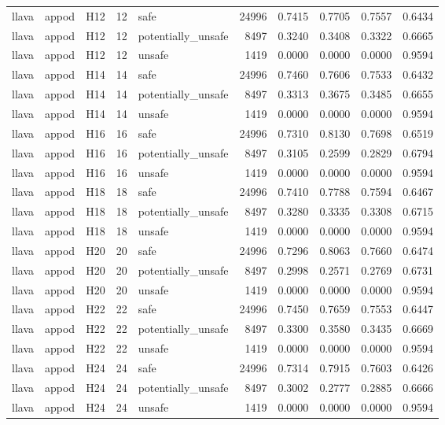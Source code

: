 \begin{table}[tbp]
\begin{tabular}{lllrlrrrrr}
llava & appod & H12 & 12 & safe & 24996 & 0.7415 & 0.7705 & 0.7557 & 0.6434 \\
llava & appod & H12 & 12 & potentially\_unsafe & 8497 & 0.3240 & 0.3408 & 0.3322 & 0.6665 \\
llava & appod & H12 & 12 & unsafe & 1419 & 0.0000 & 0.0000 & 0.0000 & 0.9594 \\
llava & appod & H14 & 14 & safe & 24996 & 0.7460 & 0.7606 & 0.7533 & 0.6432 \\
llava & appod & H14 & 14 & potentially\_unsafe & 8497 & 0.3313 & 0.3675 & 0.3485 & 0.6655 \\
llava & appod & H14 & 14 & unsafe & 1419 & 0.0000 & 0.0000 & 0.0000 & 0.9594 \\
llava & appod & H16 & 16 & safe & 24996 & 0.7310 & 0.8130 & 0.7698 & 0.6519 \\
llava & appod & H16 & 16 & potentially\_unsafe & 8497 & 0.3105 & 0.2599 & 0.2829 & 0.6794 \\
llava & appod & H16 & 16 & unsafe & 1419 & 0.0000 & 0.0000 & 0.0000 & 0.9594 \\
llava & appod & H18 & 18 & safe & 24996 & 0.7410 & 0.7788 & 0.7594 & 0.6467 \\
llava & appod & H18 & 18 & potentially\_unsafe & 8497 & 0.3280 & 0.3335 & 0.3308 & 0.6715 \\
llava & appod & H18 & 18 & unsafe & 1419 & 0.0000 & 0.0000 & 0.0000 & 0.9594 \\
llava & appod & H20 & 20 & safe & 24996 & 0.7296 & 0.8063 & 0.7660 & 0.6474 \\
llava & appod & H20 & 20 & potentially\_unsafe & 8497 & 0.2998 & 0.2571 & 0.2769 & 0.6731 \\
llava & appod & H20 & 20 & unsafe & 1419 & 0.0000 & 0.0000 & 0.0000 & 0.9594 \\
llava & appod & H22 & 22 & safe & 24996 & 0.7450 & 0.7659 & 0.7553 & 0.6447 \\
llava & appod & H22 & 22 & potentially\_unsafe & 8497 & 0.3300 & 0.3580 & 0.3435 & 0.6669 \\
llava & appod & H22 & 22 & unsafe & 1419 & 0.0000 & 0.0000 & 0.0000 & 0.9594 \\
llava & appod & H24 & 24 & safe & 24996 & 0.7314 & 0.7915 & 0.7603 & 0.6426 \\
llava & appod & H24 & 24 & potentially\_unsafe & 8497 & 0.3002 & 0.2777 & 0.2885 & 0.6666 \\
llava & appod & H24 & 24 & unsafe & 1419 & 0.0000 & 0.0000 & 0.0000 & 0.9594 \\

\end{tabular}
\end{table}

